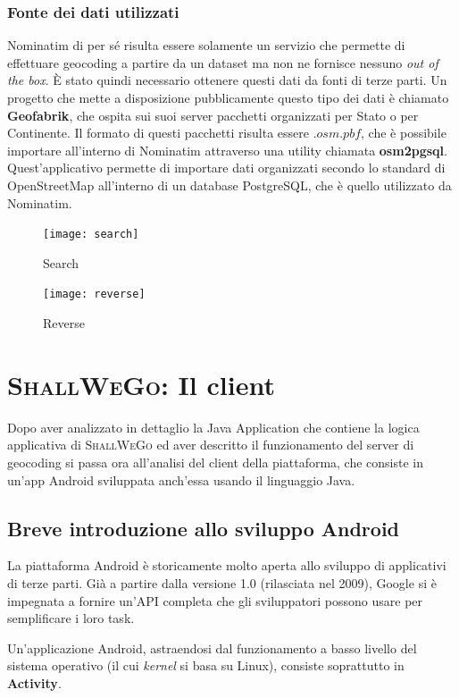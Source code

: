         \subsubsection{Fonte dei dati utilizzati}
            Nominatim di per sé risulta essere solamente un servizio che permette di effettuare geocoding a partire da un dataset ma non ne fornisce nessuno \textit{out of the box}. È stato quindi necessario ottenere questi dati da fonti di terze parti. Un progetto che mette a disposizione pubblicamente questo tipo dei dati è chiamato \textbf{Geofabrik}, che ospita sui suoi server pacchetti organizzati per Stato o per Continente. Il formato di questi pacchetti risulta essere $.osm.pbf$, che è possibile importare all'interno di Nominatim attraverso una utility chiamata \textbf{osm2pgsql}. Quest'applicativo permette di importare dati organizzati secondo lo standard di OpenStreetMap all'interno di un database PostgreSQL, che è quello utilizzato da Nominatim.

        \begin{figure}[H]
            \centering
            \texttt{[image: search]}
            \caption{Search}
            \vspace{0.5cm}
            \texttt{[image: reverse]}
            \caption{Reverse}
        \end{figure}

        \section{\textsc{ShallWeGo}: Il client}
            Dopo aver analizzato in dettaglio la Java Application che contiene la logica applicativa di \textsc{ShallWeGo} ed aver descritto il funzionamento del server di geocoding si passa ora all'analisi del client della piattaforma, che consiste in un'app Android sviluppata anch'essa usando il linguaggio Java.

        \subsection{Breve introduzione allo sviluppo Android}
            La piattaforma Android è storicamente molto aperta allo sviluppo di applicativi di terze parti. Già a partire dalla versione 1.0 (rilasciata nel 2009), Google si è impegnata a fornire un'API completa che gli sviluppatori possono usare per semplificare i loro task.

            Un'applicazione Android, astraendosi dal funzionamento a basso livello del sistema operativo (il cui \textit{kernel} si basa su Linux), consiste soprattutto in \textbf{Activity}.

